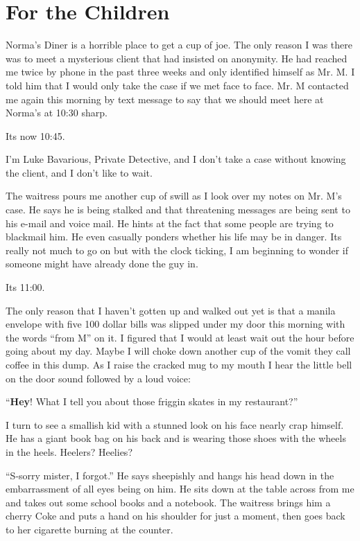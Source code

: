 \chapter{For the Children}


Norma's Diner is a horrible place to get a cup of joe. The only
reason I was there was to meet a mysterious client that had
insisted on anonymity. He had reached me twice by phone in the past
three weeks and only identified himself as Mr. M. I told him that I
would only take the case if we met face to face. Mr. M contacted me
again this morning by text message to say that we should meet here
at Norma's at 10:30 sharp.



Its now 10:45.



I'm Luke Bavarious, Private Detective, and I don't take a case
without knowing the client, and I don't like to wait.



The waitress pours me another cup of swill as I look over my notes
on Mr. M's case. He says he is being stalked and that threatening
messages are being sent to his e-mail and voice mail. He hints at
the fact that some people are trying to blackmail him. He even
casually ponders whether his life may be in danger. Its really not
much to go on but with the clock ticking, I am beginning to wonder
if someone might have already done the guy in.



Its 11:00.



The only reason that I haven't gotten up and walked out yet is that
a manila envelope with five 100 dollar bills was slipped under my
door this morning with the words ``from M'' on it. I figured that I
would at least wait out the hour before going about my day. Maybe I
will choke down another cup of the vomit they call coffee in this
dump. As I raise the cracked mug to my mouth I hear the little bell
on the door sound followed by a loud voice:



``{\bf Hey}! What I tell you about those friggin skates in my
restaurant?''

I turn to see a smallish kid with a stunned look on his face nearly
crap himself. He has a giant book bag on his back and is wearing
those shoes with the wheels in the heels. Heelers? Heelies?



``S-sorry mister, I forgot.'' He says sheepishly and hangs his head
down in the embarrassment of all eyes being on him. He sits down at
the table across from me and takes out some school books and a
notebook. The waitress brings him a cherry Coke and puts a hand on
his shoulder for just a moment, then goes back to her cigarette
burning at the counter.



